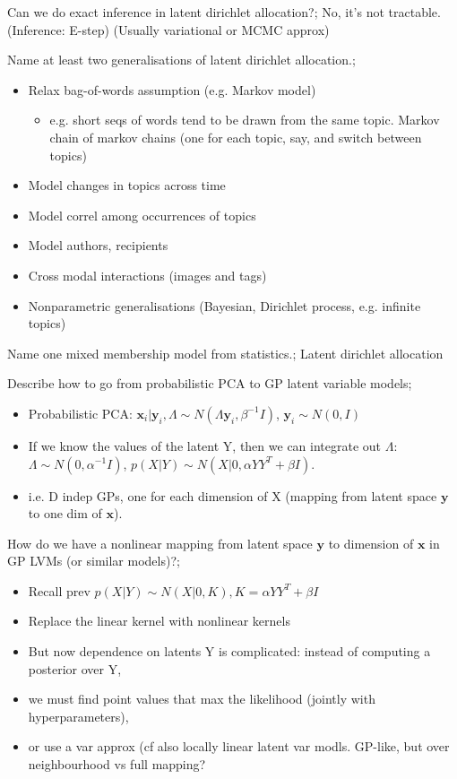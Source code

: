 \documentclass{article}
\begin{document}
Can we do exact inference in latent dirichlet allocation?; No, it's not tractable. (Inference: E-step) (Usually variational or MCMC approx)

Name at least two generalisations of latent dirichlet allocation.; \begin{itemize} \item Relax bag-of-words assumption (e.g. Markov model) \begin{itemize} \item e.g. short seqs of words tend to be drawn from the same topic. Markov chain of markov chains (one for each topic, say, and switch between topics) \end{itemize} \item Model changes in topics across time \item Model correl among occurrences of topics \item Model authors, recipients \item Cross modal interactions (images and tags) \item Nonparametric generalisations (Bayesian, Dirichlet process, e.g. infinite topics) \end{itemize}

Name one mixed membership model from statistics.; Latent dirichlet allocation


Describe how to go from probabilistic PCA to GP latent variable models; \begin{itemize} \item Probabilistic PCA: $\mathbf{x}_i|\mathbf{y}_i, \Lambda \sim N(\Lambda\mathbf{y}_i, \beta^{-1}I)$, $\mathbf{y}_i\sim N(0, I)$ \item If we know the values of the latent Y, then we can integrate out $\Lambda$: $\Lambda\sim N(0, \alpha^{-1}I)$, $p(X|Y)\sim N(X | 0, \alpha YY^T + \beta I)$. \item i.e. D indep GPs, one for each dimension of X (mapping from latent space $\mathbf{y}$ to one dim of $\mathbf{x}$). \end{itemize}

How do we have a nonlinear mapping from latent space $\mathbf{y}$ to dimension of $\mathbf{x}$ in GP LVMs (or similar models)?; \begin{itemize} \item Recall prev $p(X|Y)\sim N(X | 0, K), K = \alpha YY^T + \beta I$ \item Replace the linear kernel with nonlinear kernels \item But now dependence on latents Y is complicated: instead of computing a posterior over Y,  \item we must find point values that max the likelihood (jointly with hyperparameters),  \item or use a var approx (cf also locally linear latent var modls. GP-like, but over neighbourhood vs full mapping? \end{itemize}
\end{document}
